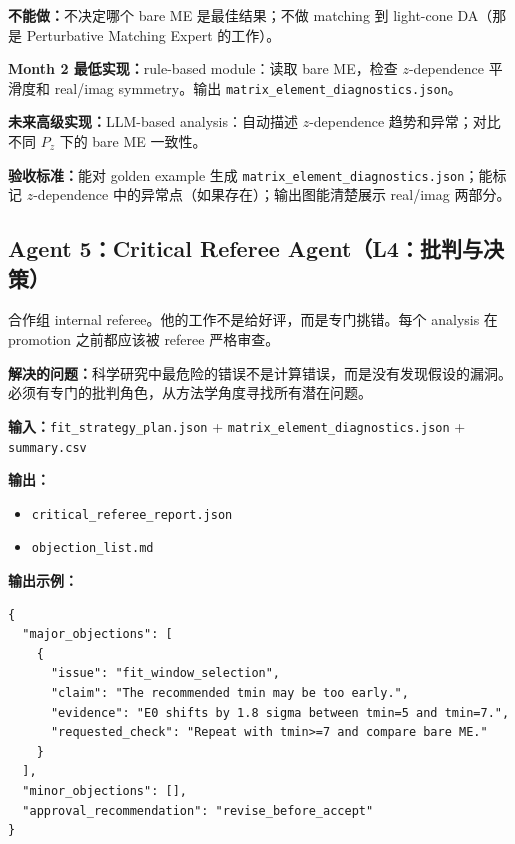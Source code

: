 \documentclass[11pt,a4paper,fontset=fandol]{ctexart}
\begin{document}
\textbf{不能做：}不决定哪个 bare ME 是最佳结果；不做 matching 到 light-cone DA（那是 Perturbative Matching Expert 的工作）。

\textbf{Month 2 最低实现：}rule-based module：读取 bare ME，检查 $z$-dependence 平滑度和 real/imag symmetry。输出 \texttt{matrix\_element\_diagnostics.json}。

\textbf{未来高级实现：}LLM-based analysis：自动描述 $z$-dependence 趋势和异常；对比不同 $P_z$ 下的 bare ME 一致性。

\textbf{验收标准：}能对 golden example 生成 \texttt{matrix\_element\_diagnostics.json}；能标记 $z$-dependence 中的异常点（如果存在）；输出图能清楚展示 real/imag 两部分。

\subsection{Agent 5：Critical Referee Agent（L4：批判与决策）}

\begin{tcolorbox}[colback=gray!5,colframe=gray!50,title=真实科研组类比]
合作组 internal referee。他的工作不是给好评，而是专门挑错。每个 analysis 在 promotion 之前都应该被 referee 严格审查。
\end{tcolorbox}

\textbf{解决的问题：}科学研究中最危险的错误不是计算错误，而是没有发现假设的漏洞。必须有专门的批判角色，从方法学角度寻找所有潜在问题。

\textbf{输入：}\texttt{fit\_strategy\_plan.json} + \texttt{matrix\_element\_diagnostics.json} + \texttt{summary.csv}

\textbf{输出：}
\begin{itemize}
  \item \texttt{critical\_referee\_report.json}
  \item \texttt{objection\_list.md}
\end{itemize}

\textbf{输出示例：}
\begin{lstlisting}
{
  "major_objections": [
    {
      "issue": "fit_window_selection",
      "claim": "The recommended tmin may be too early.",
      "evidence": "E0 shifts by 1.8 sigma between tmin=5 and tmin=7.",
      "requested_check": "Repeat with tmin>=7 and compare bare ME."
    }
  ],
  "minor_objections": [],
  "approval_recommendation": "revise_before_accept"
}
\end{lstlisting}
\end{document}

